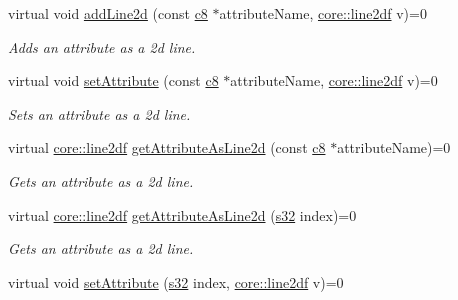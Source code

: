 \begin{DoxyCompactItemize}
virtual void \hyperlink{classirr_1_1io_1_1IAttributes_abf98be37e1be44dfde1f5a34c2e31240}{add\+Line2d} (const \hyperlink{namespaceirr_a9395eaea339bcb546b319e9c96bf7410}{c8} $\ast$attribute\+Name, \hyperlink{namespaceirr_1_1core_aeb733b0cceca2d174bf42ad477566204}{core\+::line2df} v)=0
\begin{DoxyCompactList}\small\item\em Adds an attribute as a 2d line. \end{DoxyCompactList}\item 
\mbox{\label{classirr_1_1io_1_1IAttributes_aedfdad4b7196cb04dc45c9b4ab5a15f5}} 
virtual void \hyperlink{classirr_1_1io_1_1IAttributes_aedfdad4b7196cb04dc45c9b4ab5a15f5}{set\+Attribute} (const \hyperlink{namespaceirr_a9395eaea339bcb546b319e9c96bf7410}{c8} $\ast$attribute\+Name, \hyperlink{namespaceirr_1_1core_aeb733b0cceca2d174bf42ad477566204}{core\+::line2df} v)=0
\begin{DoxyCompactList}\small\item\em Sets an attribute as a 2d line. \end{DoxyCompactList}\item 
virtual \hyperlink{namespaceirr_1_1core_aeb733b0cceca2d174bf42ad477566204}{core\+::line2df} \hyperlink{classirr_1_1io_1_1IAttributes_ace0d40cce5fad56cbe030d63c5743854}{get\+Attribute\+As\+Line2d} (const \hyperlink{namespaceirr_a9395eaea339bcb546b319e9c96bf7410}{c8} $\ast$attribute\+Name)=0
\begin{DoxyCompactList}\small\item\em Gets an attribute as a 2d line. \end{DoxyCompactList}\item 
virtual \hyperlink{namespaceirr_1_1core_aeb733b0cceca2d174bf42ad477566204}{core\+::line2df} \hyperlink{classirr_1_1io_1_1IAttributes_aa03235ad3ff3eb4468c424c171ee652f}{get\+Attribute\+As\+Line2d} (\hyperlink{namespaceirr_ac66849b7a6ed16e30ebede579f9b47c6}{s32} index)=0
\begin{DoxyCompactList}\small\item\em Gets an attribute as a 2d line. \end{DoxyCompactList}\item 
\mbox{\label{classirr_1_1io_1_1IAttributes_a818870208df1c6dc37462451761efab1}} 
virtual void \hyperlink{classirr_1_1io_1_1IAttributes_a818870208df1c6dc37462451761efab1}{set\+Attribute} (\hyperlink{namespaceirr_ac66849b7a6ed16e30ebede579f9b47c6}{s32} index, \hyperlink{namespaceirr_1_1core_aeb733b0cceca2d174bf42ad477566204}{core\+::line2df} v)=0

\end{DoxyCompactItemize}
